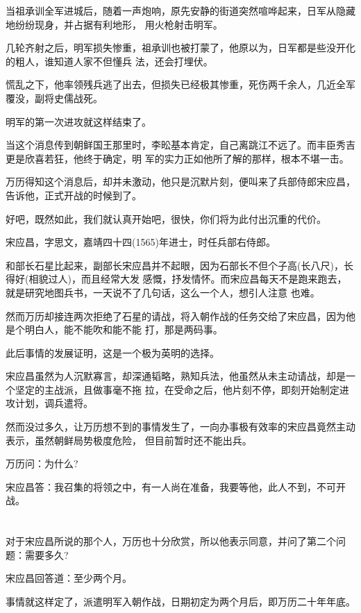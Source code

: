 \documentclass[11pt,a4paper,onecolumn]{article}
\begin{document}
当祖承训全军进城后，随着一声炮响，原先安静的街道突然喧哗起来，日军从隐藏地纷纷现身，并占据有利地形，
用火枪射击明军。

几轮齐射之后，明军损失惨重，祖承训也被打蒙了，他原以为，日军都是些没开化的粗人，谁知道人家不但懂兵
法，还会打埋伏。

慌乱之下，他率领残兵逃了出去，但损失已经极其惨重，死伤两千余人，几近全军覆没，副将史儒战死。

明军的第一次进攻就这样结束了。

当这个消息传到朝鲜国王那里时，李昖基本肯定，自己离跳江不远了。而丰臣秀吉更是欣喜若狂，他终于确定，明
军的实力正如他所了解的那样，根本不堪一击。

万历得知这个消息后，却并未激动，他只是沉默片刻，便叫来了兵部侍郎宋应昌，告诉他，正式开战的时候到了。

好吧，既然如此，我们就认真开始吧，很快，你们将为此付出沉重的代价。

宋应昌，字思文，嘉靖四十四(1565)年进士，时任兵部右侍郎。

和部长石星比起来，副部长宋应昌并不起眼，因为石部长不但个子高(长八尺)，长得好(相貌过人)，而且经常大发
感慨，抒发情怀。而宋应昌每天不是跑来跑去，就是研究地图兵书，一天说不了几句话，这么一个人，想引人注意
也难。

然而万历却接连两次拒绝了石星的请战，将入朝作战的任务交给了宋应昌，因为他是个明白人，能不能吹和能不能
打，那是两码事。

此后事情的发展证明，这是一个极为英明的选择。

宋应昌虽然为人沉默寡言，却深通韬略，熟知兵法，他虽然从未主动请战，却是一个坚定的主战派，且做事毫不拖
拉，在受命之后，他片刻不停，即刻开始制定进攻计划，调兵遣将。

然而没过多久，让万历想不到的事情发生了，一向办事极有效率的宋应昌竟然主动表示，虽然朝鲜局势极度危险，
但目前暂时还不能出兵。

万历问：为什么?

宋应昌答：我召集的将领之中，有一人尚在准备，我要等他，此人不到，不可开战。

\section[\thesection]{}

对于宋应昌所说的那个人，万历也十分欣赏，所以他表示同意，并问了第二个问题：需要多久?

宋应昌回答道：至少两个月。

事情就这样定了，派遣明军入朝作战，日期初定为两个月后，即万历二十年年底。
\end{document}
